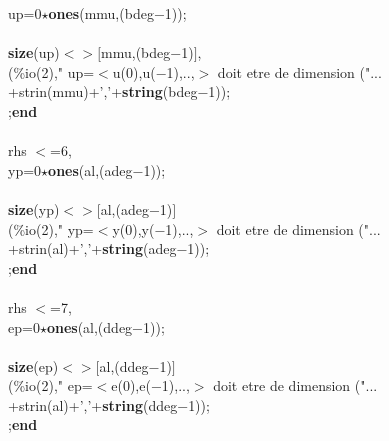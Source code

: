 {\begin{flushleft}
{\cmarg \hspace{0.8cm}up=0$\star${\bf ones}(mmu,(bdeg$-$1));\\ 
 \\ 
\cmarg \hspace{0.8cm}{\bf if} {\bf size}(up)$<$$>$$[$mmu,(bdeg$-$1)$]$,\\ 
\cmarg \hspace{1.0cm}{\bf write}(\%io(2)," up=$<$u(0),u($-$1),..,$>$ doit etre de dimension ("...\\ 
\cmarg \hspace{1.0cm}+strin(mmu)+','+{\bf string}(bdeg$-$1));\\ 
\cmarg \hspace{1.0cm}{\bf return};{\bf end} \\ 
\\ 
 rhs $<$=6, \\ 
\cmarg \hspace{0.8cm}yp=0$\star${\bf ones}(al,(adeg$-$1));\\ 
 \\ 
\cmarg \hspace{0.5cm}{\bf if} {\bf size}(yp)$<$$>$$[$al,(adeg$-$1)$]$\\ 
\cmarg \hspace{1.0cm}{\bf write}(\%io(2)," yp=$<$y(0),y($-$1),..,$>$ doit etre de dimension ("...\\ 
\cmarg \hspace{1.0cm}+strin(al)+','+{\bf string}(adeg$-$1));\\ 
\cmarg \hspace{1.0cm}{\bf return};{\bf end}\\ 
\\ 
 rhs $<$=7, \\ 
\cmarg \hspace{0.8cm}ep=0$\star${\bf ones}(al,(ddeg$-$1));\\ 
 \\ 
\cmarg \hspace{0.5cm}{\bf if} {\bf size}(ep)$<$$>$$[$al,(ddeg$-$1)$]$\\ 
\cmarg \hspace{1.0cm}{\bf write}(\%io(2)," ep=$<$e(0),e($-$1),..,$>$ doit etre de dimension ("...\\ 
\cmarg \hspace{1.0cm}+strin(al)+','+{\bf string}(ddeg$-$1));\\ 
\cmarg \hspace{1.0cm}{\bf return};{\bf end}\\ 
}
\end{flushleft}}
